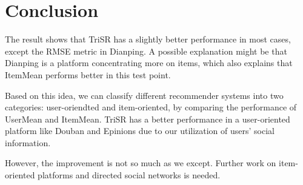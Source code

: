 \documentclass{article}
\begin{document}
\section{Conclusion}
\label{conclusion}
The result shows that TriSR has a slightly better performance in most cases, except 
the RMSE metric in Dianping. A possible explanation might be that Dianping is a platform 
concentrating more on items, which also explains that ItemMean performs better in this test point. 

Based on this idea, we can classify different recommender systems into two categories: 
user-oriendted and item-oriented, by comparing the performance of UserMean and ItemMean.
TriSR has a better performance in a user-oriented platform like Douban and Epinions due to
our utilization of users' social information.

However, the improvement is not so much as we except. Further work on item-oriented 
platforms and directed social networks is needed. 



\end{document}
